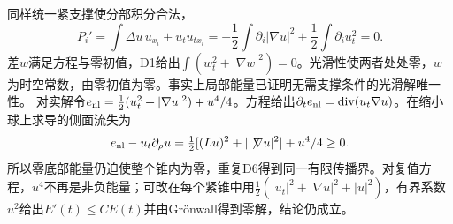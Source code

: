 \documentclass[UTF8,fontset=fandol,11pt]{ctexart}
\begin{document}
同样统一紧支撑使分部积分合法，
\[P_i'=\int\Delta u\,u_{x_i}+u_tu_{tx_i}=-\frac12\int\partial_i|\nabla u|^2+\frac12\int\partial_i u_t^2=0.\]
差$w$满足方程与零初值，D1给出$\int(w_t^2+|\nabla w|^2)=0$。光滑性使两者处处零，$w$为时空常数，由零初值为零。事实上局部能量已证明无需支撑条件的光滑解唯一性。
对实解令$e_{\rm nl}=\frac12(u_t^2+|\nabla u|^2)+u^4/4$。方程给出$\partial_te_{\rm nl}=\operatorname{div}(u_t\nabla u)$。在缩小球上求导的侧面流失为
\[e_{\rm nl}-u_t\partial_\rho u=\tfrac12[(Lu)^2+|\not\!\nabla u|^2]+u^4/4\ge0.\]
所以零底部能量仍迫使整个锥内为零，重复D6得到同一有限传播界。对复值方程，$u^4$不再是非负能量；可改在每个紧锥中用$\frac12(|u_t|^2+|\nabla u|^2+|u|^2)$，有界系数$u^2$给出$E'(t)\le C E(t)$并由Grönwall得到零解，结论仍成立。
\originalpages
\end{document}
